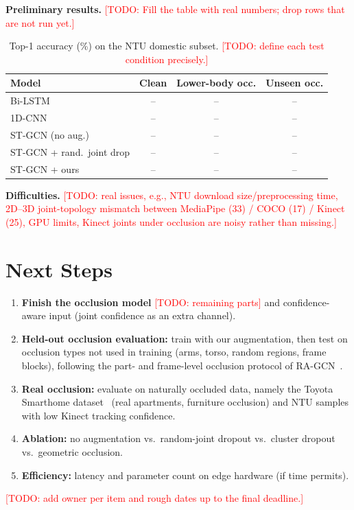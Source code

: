 \documentclass[11pt,twocolumn,letterpaper]{article}
\newcommand{\todo}[1]{\textcolor{red}{[TODO: #1]}}
\begin{document}
\textbf{Preliminary results.} \todo{Fill the table with real numbers; drop rows that are not run yet.}

\begin{table}[h]
\centering
\small
\begin{tabular}{@{}lccc@{}}
\toprule
Model & Clean & Lower-body occ. & Unseen occ. \\
\midrule
Bi-LSTM              & -- & -- & -- \\
1D-CNN               & -- & -- & -- \\
ST-GCN (no aug.)     & -- & -- & -- \\
ST-GCN + rand.\ joint drop & -- & -- & -- \\
ST-GCN + ours        & -- & -- & -- \\
\bottomrule
\end{tabular}
\caption{Top-1 accuracy (\%) on the NTU domestic subset. \todo{define each test condition precisely.}}
\label{tab:prelim}
\end{table}

\textbf{Difficulties.} \todo{real issues, e.g., NTU download size/preprocessing time, 2D--3D joint-topology mismatch between MediaPipe (33) / COCO (17) / Kinect (25), GPU limits, Kinect joints under occlusion are noisy rather than missing.}

\section{Next Steps}
\begin{enumerate}\setlength{\itemsep}{0pt}
\item \textbf{Finish the occlusion model} \todo{remaining parts} and confidence-aware input (joint confidence as an extra channel).
\item \textbf{Held-out occlusion evaluation:} train with our augmentation, then test on occlusion types not used in training (arms, torso, random regions, frame blocks), following the part- and frame-level occlusion protocol of RA-GCN~\cite{song2020ragcn}.
\item \textbf{Real occlusion:} evaluate on naturally occluded data, namely the Toyota Smarthome dataset~\cite{das2019toyota} (real apartments, furniture occlusion) and NTU samples with low Kinect tracking confidence.
\item \textbf{Ablation:} no augmentation vs.\ random-joint dropout vs.\ cluster dropout vs.\ geometric occlusion.
\item \textbf{Efficiency:} latency and parameter count on edge hardware (if time permits).
\end{enumerate}
\todo{add owner per item and rough dates up to the final deadline.}
\end{document}
